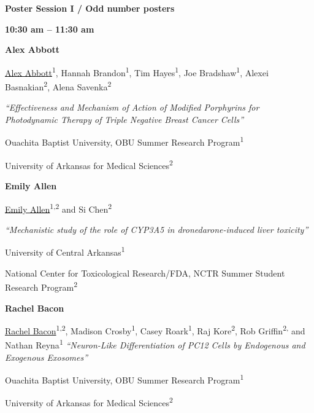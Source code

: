 \documentclass{proc}
\begin{document}
\onecolumn
\begin{framed}
\begin{center}
\textbf{Poster Session I / Odd number posters}

\textbf{10:30 am -- 11:30 am }
\end{center}
\end{framed}

\begin{description}[leftmargin=4em,style=nextline]
\item[\textbf{P1}]
\textbf{Alex Abbott}

\underline{Alex Abbott}\textsuperscript{1}, Hannah Brandon\textsuperscript{1}, Tim
Hayes\textsuperscript{1}, Joe Bradshaw\textsuperscript{1}, Alexei
Basnakian\textsuperscript{2}, Alena Savenka\textsuperscript{2}

\emph{``Effectiveness and Mechanism of Action of Modified Porphyrins for
Photodynamic Therapy of Triple Negative Breast Cancer Cells'' }

Ouachita Baptist University, OBU Summer Research
Program\textsuperscript{1}

University of Arkansas for Medical Sciences\textsuperscript{2}

\item[\textbf{P3}]
\textbf{Emily Allen}

\underline{Emily Allen}\textsuperscript{1,2} and Si Chen\textsuperscript{2}

\emph{``Mechanistic study of the role of CYP3A5 in dronedarone-induced
liver toxicity'' }

University of Central Arkansas\textsuperscript{1 }

National Center for Toxicological Research/FDA, NCTR Summer Student
Research Program\textsuperscript{2}

\item[\textbf{P5}]
\textbf{Rachel Bacon}

\underline{Rachel Bacon}\textsuperscript{1,2}, Madison Crosby\textsuperscript{1},
Casey Roark\textsuperscript{1}, Raj Kore\textsuperscript{2}, Rob
Griffin\textsuperscript{2,} and Nathan Reyna\textsuperscript{1}
\emph{``Neuron-Like Differentiation of PC12 Cells by Endogenous and
Exogenous Exosomes'' }

Ouachita Baptist University, OBU Summer Research
Program\textsuperscript{1}

University of Arkansas for Medical Sciences\textsuperscript{2}
\end{description}
\end{document}
